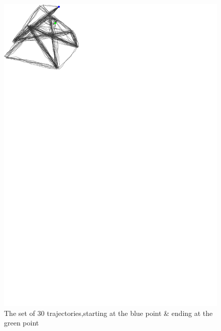 \begin{figure}
\centering
\includegraphics[scale=1]{Gambar/all30_visual}
\caption[The set of 30 trajectories, starting at the blue point \& ending at the green point]{The set of 30 trajectories,starting at the blue point \& ending at the green point} 
\label{fig:all30_visual}
\end{figure}


